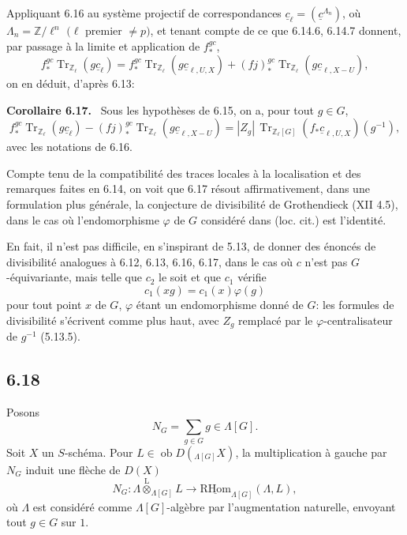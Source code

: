 \documentclass[11pt]{article}
\newenvironment{statement}[1]{\par\medskip\noindent\textbf{#1.}\ }{\par\medskip}
\providecommand{\RHom}{\mathrm{RHom}}
\providecommand{\uRHom}{\underline{\RHom}}
\providecommand{\Tr}{\operatorname{Tr}}
\providecommand{\Tr}{\operatorname{Tr}}
\providecommand{\lten}{\overset{\mathrm L}{\otimes}}
\providecommand{\Ob}{\operatorname{ob}}
\providecommand{\Tr}{\operatorname{Tr}}
\providecommand{\RHom}{\mathrm{RHom}}
\providecommand{\lten}{\overset{\mathrm L}{\otimes}}
\providecommand{\RHom}{\mathrm R\mathcal{H}om}
\providecommand{\lten}{\overset{\mathrm L}{\otimes}}
\providecommand{\Ob}{\operatorname{ob}}
\providecommand{\Tr}{\operatorname{Tr}}
\providecommand{\lten}{\overset{\mathrm L}{\otimes}}
\providecommand{\lten}{\overset{\mathrm L}{\otimes}}
\providecommand{\Ob}{\operatorname{Ob}}
\providecommand{\lten}{\overset{\mathrm L}{\otimes}}
\providecommand{\RHom}{\mathrm{RHom}}
\providecommand{\Tr}{\operatorname{Tr}}
\providecommand{\Ob}{\operatorname{ob}}
\providecommand{\Ob}{\operatorname{Ob}}
\providecommand{\lten}{\overset{\mathrm L}{\otimes}}
\begin{document}
Appliquant 6.16 au système projectif de correspondances $\underline c_{\ell}=(\underline c^{\Lambda_n})$, où $\Lambda_n=\mathbb Z/\ell^n$ $(\ell$ premier $\ne p)$, et tenant compte de ce que 6.14.6, 6.14.7 donnent, par passage à la limite et application de $f_*^{gc}$,
\[
f_*^{gc}\Tr_{\mathbb Z_{\ell}}(g\underline c_{\ell})
=
f_*^{gc}\Tr_{\mathbb Z_{\ell}}(g\underline c_{\ell,U,X})
+(fj)_*^{gc}\Tr_{\mathbb Z_{\ell}}(g\underline c_{\ell,X-U}),
\]
on en déduit, d'après 6.13:

\begin{statement}{Corollaire 6.17}
Sous les hypothèses de 6.15, on a, pour tout $g\in G$,
\begin{equation}
f_*^{gc}\Tr_{\mathbb Z_{\ell}}(g\underline c_{\ell})
-(fj)_*^{gc}\Tr_{\mathbb Z_{\ell}}(g\underline c_{\ell,X-U})
=
|Z_g|\,\Tr_{\mathbb Z_{\ell}[G]}(f_*\underline c_{\ell,U,X})(g^{-1}),
\tag{6.17.1}
\end{equation}
avec les notations de 6.16.
\end{statement}

Compte tenu de la compatibilité des traces locales à la localisation et des remarques faites en 6.14, on voit que 6.17 résout affirmativement, dans une formulation plus générale, la conjecture de divisibilité de Grothendieck (XII 4.5), dans le cas où l'endomorphisme $\varphi$ de $G$ considéré dans (loc. cit.) est l'identité.

En fait, il n'est pas difficile, en s'inspirant de 5.13, de donner des énoncés de divisibilité analogues à 6.12, 6.13, 6.16, 6.17, dans le cas où $c$ n'est pas $G$-équivariante, mais telle que $c_2$ le soit et que $c_1$ vérifie
\[
c_1(xg)=c_1(x)\varphi(g)
\]
pour tout point $x$ de $G$, $\varphi$ étant un endomorphisme donné de $G$: les formules de divisibilité s'écrivent comme plus haut, avec $Z_g$ remplacé par le $\varphi$-centralisateur de $g^{-1}$ (5.13.5).

\subsection*{6.18}
Posons
\begin{equation}
N_G=\sum_{g\in G} g\in\Lambda[G].
\tag{6.18.1}
\end{equation}
Soit $X$ un $S$-schéma. Pour $L\in\Ob D({}_{\Lambda[G]}X)$, la multiplication à gauche par $N_G$ induit une flèche de $D(X)$
\begin{equation}
N_G:\Lambda\lten_{\Lambda[G]}L
\longrightarrow
\uRHom_{\Lambda[G]}(\Lambda,L),
\tag{6.18.2}
\end{equation}
où $\Lambda$ est considéré comme $\Lambda[G]$-algèbre par l'augmentation naturelle, envoyant tout $g\in G$ sur $1$.
\end{document}
